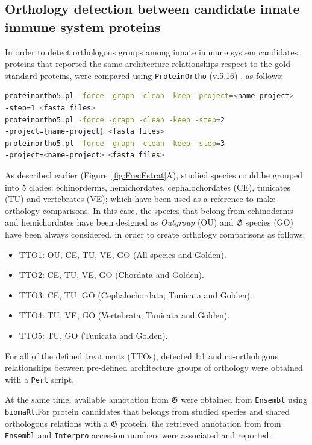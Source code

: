 \documentclass[11pt]{article}
\begin{document}
\subsection*{Orthology detection between candidate innate immune system 
proteins}
In order to detect orthologous groups among innate immune system candidates, 
proteins that reported the same architecture relationships respect to the gold 
standard proteins, were compared using \texttt{ProteinOrtho} (v.5.16) \cite{Lechner2011}, 
as follows:

\begin{lstlisting}[language=bash, breaklines=true]
proteinortho5.pl -force -graph -clean -keep -project=<name-project> 
-step=1 <fasta files>
proteinortho5.pl -force -graph -clean -keep -step=2 
-project={name-project} <fasta files>
proteinortho5.pl -force -graph -clean -keep -step=3  
-project=<name-project> <fasta files>
\end{lstlisting}

As described earlier (Figure~\ref{fig:FrecEstrat}A), studied species could be grouped
into $5$ clades: echinorderms, hemichordates, cephalochordates (CE), tunicates (TU) and vertebrates 
(VE); which have been used as a reference to make orthology comparisons. In this case, the species that belong
from echinoderms and hemichordates have been designed as \textsl{Outgroup} (OU) and 
$\boldsymbol{\mathfrak{G}}$  species (GO) have been always considered, in order to create orthology
comparisons as follows:
\begin{itemize}
 \item TTO1: OU, CE, TU, VE, GO (All species and Golden).
 \item TTO2: CE, TU, VE, GO (Chordata and Golden).
 \item TTO3: CE, TU, GO (Cephalochordata, Tunicata and Golden).
 \item TTO4: TU, VE, GO (Vertebrata, Tunicata and Golden).
 \item TTO5: TU, GO (Tunicata and Golden).
\end{itemize}

For all of the defined treatments (TTOs), detected 1:1 and co-orthologous relationships between 
pre-defined architecture groups of orthology were obtained with a \texttt{Perl} script.

At the same time, available annotation from $\boldsymbol{\mathfrak{G}}$ were obtained from 
\texttt{Ensembl} using \texttt{biomaRt}.For protein candidates that belongs from studied 
species and shared orthologous relations with a $\boldsymbol{\mathfrak{G}}$ protein, the 
retrieved annotation from from \texttt{Ensembl} and \texttt{Interpro} accession numbers were 
associated and reported.
\end{document}

